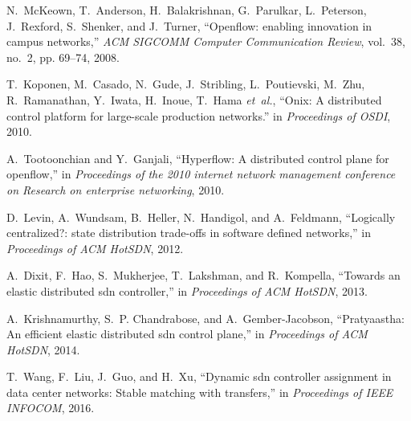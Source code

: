 \documentclass[10pt,journal,compsoc]{IEEEtran}
\begin{document}
%
%
%
\begin{thebibliography}{1}

N.~McKeown, T.~Anderson, H.~Balakrishnan, G.~Parulkar, L.~Peterson, J.~Rexford,
  S.~Shenker, and J.~Turner, ``Openflow: enabling innovation in campus
  networks,'' \emph{ACM SIGCOMM Computer Communication Review}, vol.~38, no.~2,
  pp. 69--74, 2008.

T.~Koponen, M.~Casado, N.~Gude, J.~Stribling, L.~Poutievski, M.~Zhu,
  R.~Ramanathan, Y.~Iwata, H.~Inoue, T.~Hama \emph{et~al.}, ``Onix: A
  distributed control platform for large-scale production networks.'' in
  \emph{Proceedings of OSDI}, 2010.

A.~Tootoonchian and Y.~Ganjali, ``Hyperflow: A distributed control plane for
  openflow,'' in \emph{Proceedings of the 2010 internet network management
  conference on Research on enterprise networking}, 2010.

D.~Levin, A.~Wundsam, B.~Heller, N.~Handigol, and A.~Feldmann, ``Logically
  centralized?: state distribution trade-offs in software defined networks,''
  in \emph{Proceedings of ACM HotSDN}, 2012.

A.~Dixit, F.~Hao, S.~Mukherjee, T.~Lakshman, and R.~Kompella, ``Towards an
  elastic distributed sdn controller,'' in \emph{Proceedings of ACM HotSDN},
  2013.

A.~Krishnamurthy, S.~P. Chandrabose, and A.~Gember-Jacobson, ``Pratyaastha: An
  efficient elastic distributed sdn control plane,'' in \emph{Proceedings of
  ACM HotSDN}, 2014.

T.~Wang, F.~Liu, J.~Guo, and H.~Xu, ``Dynamic sdn controller assignment in data
  center networks: Stable matching with transfers,'' in \emph{Proceedings of
  IEEE INFOCOM}, 2016.


\end{thebibliography}
\end{document}
